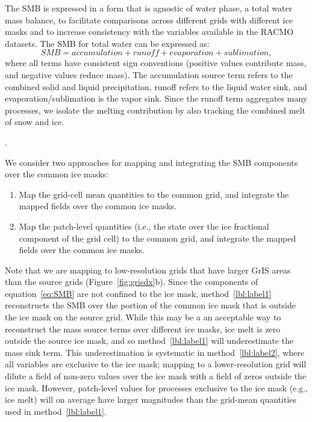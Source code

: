 \documentclass[draft]{agujournal2019}
\begin{document}
The SMB is expressed in a form that is agnostic of water phase, a total water mass balance, to facilitate comparisons across different grids with different ice masks and to increase consistency with the variables available in the RACMO datasets. The SMB for total water can be expressed as:
\begin{equation}
SMB = accumulation + runoff + evaporation + sublimation, \label{eq:SMB}
\end{equation}
where all terms have consistent sign conventions (positive values contribute mass, and negative values reduce mass). The accumulation source term refers to the combined solid and liquid precipitation, runoff refers to the liquid water sink, and evaporation/sublimation is the vapor sink. Since the runoff term aggregates many processes, we isolate the melting contribution by also tracking the combined melt of snow and ice. 

{}.

We consider two approaches for mapping and integrating the SMB components over the common ice masks:
\begin{enumerate}
\item Map the grid-cell mean quantities to the common grid, and integrate the mapped fields over the common ice masks. \label{lbl:label1}
\item Map the patch-level quantities (i.e., the state over the ice fractional component of the grid cell) to the common grid, and integrate the mapped fields over the common ice masks. \label{lbl:label2}
\end{enumerate}

Note that we are mapping to low-resolution grids that have larger GrIS areas than the source grids (Figure~\ref{fig:grisdx}b). Since the components of equation~\ref{eq:SMB} are not confined to the ice mask, method~\ref{lbl:label1} reconstructs the SMB over the portion of the common ice mask that is outside the ice mask on the source grid. While this may be a an acceptable way to reconstruct the mass source terms over different ice masks, ice melt is zero outside the source ice mask, and so method~\ref{lbl:label1} will underestimate the mass sink term. This underestimation is systematic in method~\ref{lbl:label2}, where all variables are exclusive to the ice mask; mapping to a lower-resolution grid will dilute a field of non-zero values over the ice mask with a field of zeros outside the ice mask. However, patch-level values for processes exclusive to the ice mask (e.g., ice melt) will on average have larger magnitudes than the grid-mean quantities used in method~\ref{lbl:label1}.
\end{document}
